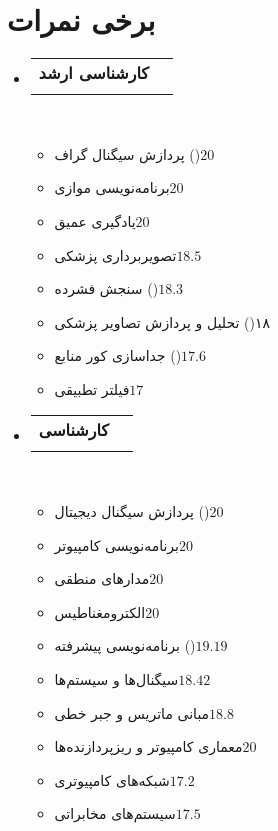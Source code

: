 \documentclass[a4paper,11pt]{article}
\makeatletter
\newcommand{\resumeItemScore}[2]{\item[]\small#1\hfill#2}
\newcommand{\resumeItemListStart}{\begin{itemize}[rightmargin=0.11in]}
\newcommand{\resumeItemListEnd}{\end{itemize}}
\newcommand{\resumeQuadHeading}[4]{
\item
\begin{tabular*}{0.96\textwidth}[t]{l@{\extracolsep{\fill}}r}
\textbf{#1} & #2 \\
\textit{\small#3} & \textit{\small #4} \\
\end{tabular*}
}
\newcommand{\resumeHeadingListStart}{
\begin{itemize}[leftmargin=0.15in, label={}]
}
\newcommand{\resumeHeadingListEnd}{\end{itemize}}
\makeatother
\begin{document}
\section{برخی نمرات} %
%
\resumeHeadingListStart{}
\resumeQuadHeading{کارشناسی ارشد}{}{}{}\\\vspace{-1.5em} %

\begin{multicols}{2}
\resumeItemListStart{}
\resumeItemScore{پردازش سیگنال گراف ()}{$20$}
\resumeItemScore{برنامه‌نویسی موازی}{$20$}
\resumeItemScore{یادگیری عمیق}{$20$}
\resumeItemScore{تصویربرداری پزشکی}{$18.5$}
\resumeItemScore{سنجش فشرده ()}{$18.3$}
\resumeItemScore{تحلیل و پردازش تصاویر پزشکی ()}{$۱۸$}
\resumeItemScore{جداسازی کور منابع ()}{$17.6$}
\resumeItemScore{فیلتر تطبیقی}{$17$}
\resumeItemListEnd{}
\end{multicols}


\resumeQuadHeading{کارشناسی}{}{}{}\\\vspace{-1.5em} %
\begin{multicols}{2}
\resumeItemListStart{}
\resumeItemScore{پردازش سیگنال دیجیتال ()}{$20$}
\resumeItemScore{برنامه‌نویسی کامپیوتر}{$20$}
\resumeItemScore{مدارهای منطقی}{$20$}
\resumeItemScore{الکترومغناطیس}{$20$}
\resumeItemScore{برنامه‌نویسی پیشرفته ()}{$19.19$}
\resumeItemScore{سیگنال‌ها و سیستم‌ها}{$18.42$}
\resumeItemScore{مبانی ماتریس و جبر خطی}{$18.8$}
\resumeItemScore{معماری کامپیوتر و ریزپردازنده‌ها}{$20$}
\resumeItemScore{شبکه‌های کامپیوتری}{$17.2$}
\resumeItemScore{سیستم‌های مخابراتی}{$17.5$}
\resumeItemListEnd{}
\end{multicols}

\resumeHeadingListEnd{}

\end{document}
